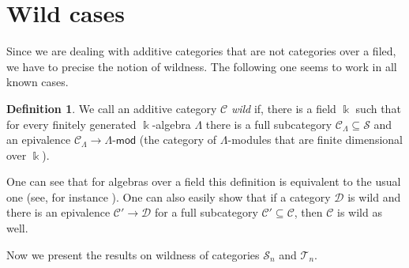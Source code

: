 \documentclass[12pt,a4paper]{amsart}
\theoremstyle{definition}
\newtheorem{defin}[theorem]{Definition}
\theoremstyle{remark}
\numberwithin{equation}{section}
\begin{document}
  \section{Wild cases}
 \label{s7}

 Since we are dealing with additive categories that are not categories
 over a filed, we have to precise the notion of wildness. The
 following one seems to work in all known cases.

 \begin{defin}\label{wild}
   We call an additive category ${\mathscr C}$ \emph{wild} if, there is a field
   ${\Bbbk}$ such that for every finitely generated ${\Bbbk}$-algebra ${\Lambda}$
   there is a full subcategory ${\mathscr C}_{\Lambda}{\subseteq}{\mathscr S}$ and an epivalence
   ${\mathscr C}_{\Lambda}\to{\Lambda}{\mbox{-}\mathsf{mod}}$ (the category of ${\Lambda}$-modules that are finite
   dimensional over ${\Bbbk}$).
 \end{defin}

 One can see that for algebras over a field this definition is
 equivalent to the usual one (see, for instance \cite{d0}). One can
 also easily show that if a category ${\mathscr D}$ is wild and there is an
 epivalence ${\mathscr C}'\to{\mathscr D}$ for a full subcategory ${\mathscr C}'{\subseteq}{\mathscr C}$, then
 ${\mathscr C}$ is wild as well.

 Now we present the results on wildness of categories ${\mathscr S}_n$ and
 ${\mathscr T}_n$. 
\end{document}
